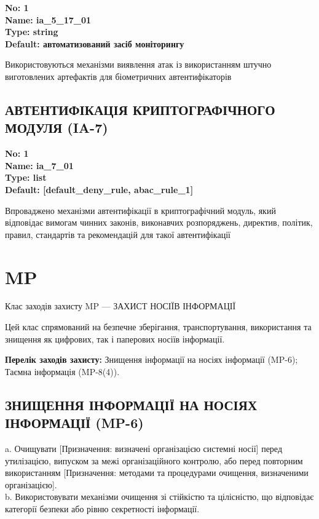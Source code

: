\documentclass{article}
\begin{document}
\vspace{10pt}
{\footnotesize\bfseries
No: 1\\
Name: ia\_5\_17\_01\\
Type: string\\
Default: \textquotedbl{}автоматизований засіб моніторингу\textquotedbl{}
}

{\footnotesize Використовуються механізми виявлення атак із використанням штучно виготовлених артефактів для біометричних автентифікаторів}




\subsection{АВТЕНТИФІКАЦІЯ КРИПТОГРАФІЧНОГО МОДУЛЯ (IA-7)}


\vspace{10pt}
{\footnotesize\bfseries
No: 1\\
Name: ia\_7\_01\\
Type: list\\
Default: [\textquotedbl{}default\_deny\_rule\textquotedbl{}, \textquotedbl{}abac\_rule\_1\textquotedbl{}]
}

{\footnotesize Впроваджено механізми автентифікації в криптографічний модуль, який відповідає вимогам чинних законів, виконавчих розпоряджень, директив, політик, правил, стандартів та рекомендацій для такої автентифікації}




\section{MP}
Клас заходів захисту MP --- ЗАХИСТ НОСІЇВ ІНФОРМАЦІЇ

Цей клас спрямований на безпечне зберігання, транспортування, використання та знищення як цифрових, так і паперових носіїв інформації.

\textbf{Перелік заходів захисту:} Знищення інформації на носіях інформації (MP-6); Таємна інформація (MP-8(4)).

\subsection{ЗНИЩЕННЯ ІНФОРМАЦІЇ НА НОСІЯХ ІНФОРМАЦІЇ (MP-6)}
a. Очищувати [Призначення: визначені організацією системні носії] перед утилізацією, випуском за межі організаційного контролю, або перед повторним використанням [Призначення: методами та процедурами очищення, визначеними організацією].\\ 
b. Використовувати механізми очищення зі стійкістю та цілісністю, що відповідає категорії безпеки або рівню секретності інформації.
\end{document}
